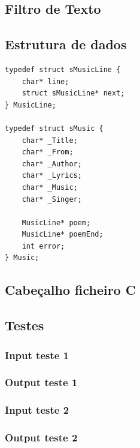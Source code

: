 \subsection{Filtro de Texto}
\label{seq:anex-music-filtro}



\subsection{Estrutura de dados}
\label{seq:anex-music-est}
\begin{verbatim}
typedef struct sMusicLine {
    char* line;
    struct sMusicLine* next;
} MusicLine;

typedef struct sMusic {
    char* _Title;
    char* _From;
    char* _Author;
    char* _Lyrics;
    char* _Music;
    char* _Singer;

    MusicLine* poem;
    MusicLine* poemEnd;
    int error;
} Music;
\end{verbatim}


\subsection{Cabeçalho ficheiro C}
\label{seq:anex-music-header}


\subsection{Testes}
\label{seq:anex-music-tests}
\subsubsection{Input teste 1}
\label{seq:anex-music-test-in01}


\subsubsection{Output teste 1}
\label{seq:anex-music-test-out01}


\subsubsection{Input teste 2}
\label{seq:anex-music-test-in02}


\subsubsection{Output teste 2}
\label{seq:anex-music-test-out02}


